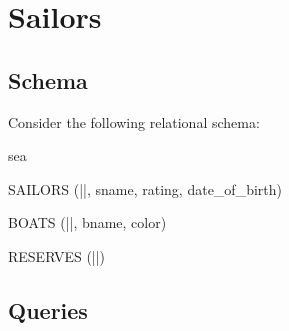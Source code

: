 \section{Sailors}

\subsection{Schema}

Consider the following relational schema:


\begin{sqlSchema}{sea}

      SAILORS (||, sname, rating, date_of_birth)

      BOATS (||, bname, color)

      RESERVES (||)

\end{sqlSchema}


\subsection{Queries}

